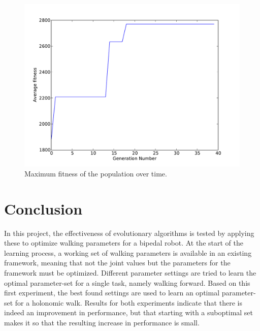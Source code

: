 \documentclass{article}
\begin{document}
\begin{figure}[h!]
	\center
	\includegraphics[width=.8\textwidth]{images/max_fitness}
	\caption{Maximum fitness of the population over time.}
	\label{fig:max}
\end{figure}
\newpage

\section{Conclusion}
In this project, the effectiveness of evolutionary algorithms is tested by applying these to optimize walking parameters for a bipedal robot. At the start of the learning process, a working set of walking parameters is available in an existing framework, meaning that not the joint values but the parameters for the framework must be optimized. Different parameter settings are tried to learn the optimal parameter-set for a single task, namely walking forward. Based on this first experiment, the best found settings are used to learn an optimal parameter-set for a holonomic walk. Results for both experiments indicate that there is indeed an improvement in performance, but that starting with a suboptimal set makes it so that the resulting increase in performance is small.
\end{document}
